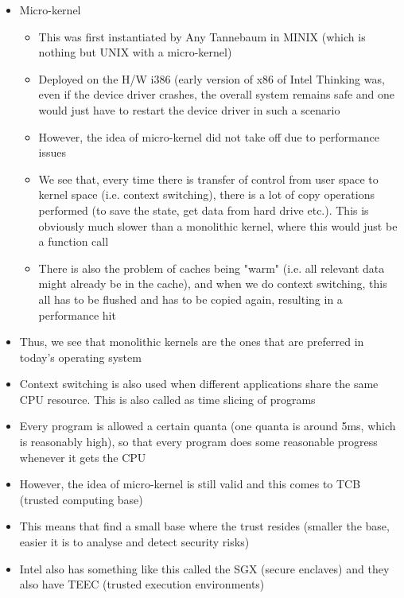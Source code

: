 \documentclass[10pt]{article}
\begin{document}
\begin{itemize}
    \item Micro-kernel
    \begin{itemize}
        \item This was first instantiated by Any Tannebaum in MINIX (which is nothing but UNIX with a micro-kernel)
        \item Deployed on the H/W i386 (early version of x86 of Intel
        Thinking was, even if the device driver crashes, the overall system remains safe and one would just have to restart the device driver in such a scenario 
        \item However, the idea of micro-kernel did not take off due to performance issues
        \item We see that, every time there is transfer of control from user space to kernel space (i.e. context switching), there is a lot of copy operations performed (to save the state, get data from hard drive etc.). This is obviously much slower than a monolithic kernel, where this would just be a function call
        \item There is also the problem of caches being "warm" (i.e. all relevant data might already be in the cache), and when we do context switching, this all has to be flushed and has to be copied again, resulting in a performance hit
    \end{itemize}
    \item Thus, we see that monolithic kernels are the ones that are preferred in today's operating system
    \item Context switching is also used when different applications share the same CPU resource. This is also called as time slicing of programs
    \item Every program is allowed a certain quanta (one quanta is around 5ms, which is reasonably high), so that every program does some reasonable progress whenever it gets the CPU
    \item However, the idea of micro-kernel is still valid and this comes to TCB (trusted computing base)
    \item This means that find a small base where the trust resides (smaller the base, easier it is to analyse and detect security risks)
    \item Intel also has something like this called the SGX (secure enclaves) and they also have TEEC (trusted execution environments)
\end{itemize}
\end{document}
